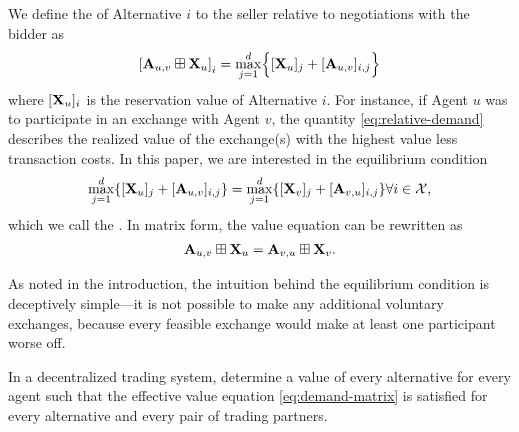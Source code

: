 \documentclass[letterpaper, 10 pt, conference]{ieeeconf}
\begin{document}
We define the  of Alternative $i$ to the seller relative to negotiations with the bidder as
\begin{align}
    \left[ \mathbf{A}_{u,v} \boxplus \mathbf{X}_u \right]_i = \max_{j=1}^{d} \Bigl\{[\mathbf{X}_u]_j + [\mathbf{A}_{u,v}]_{i,j} \Bigr\} \label{eq:relative-demand}
\end{align}
where $[\mathbf{X}_u]_i$ is the reservation value of Alternative $i$.
For instance, if Agent $u$ was to participate in an exchange with Agent $v$, the quantity \eqref{eq:relative-demand} describes the realized value of the exchange(s) with the highest value less transaction costs. In this paper, we are interested in the equilibrium condition
\begin{align}
    \max_{j=1}^{d} \{ [\mathbf{X}_u]_j + [\mathbf{A}_{u,v}]_{i,j} \} = \max_{j=1}^{d} \{ [\mathbf{X}_v]_j + [\mathbf{A}_{v,u}]_{i,j} \} \forall i \in \mathcal{X}, \nonumber
\end{align}
which we call the . In matrix form, the value equation can be rewritten as
\begin{align}
        \mathbf{A}_{u,v} \boxplus \mathbf{X}_{u} = \mathbf{A}_{v,u} \boxplus \mathbf{X}_v .\label{eq:demand-matrix}
\end{align}


As noted in the introduction, the intuition behind the equilibrium condition is deceptively simple---it is not possible to make any additional voluntary exchanges, because every feasible exchange would make at least one participant worse off.

\begin{problem} \label{prob:exact}
    In a decentralized trading system, determine a value of every alternative for every agent such that the effective value equation \eqref{eq:demand-matrix} is satisfied for every alternative and every pair of trading partners.
\end{problem}
\end{document}
